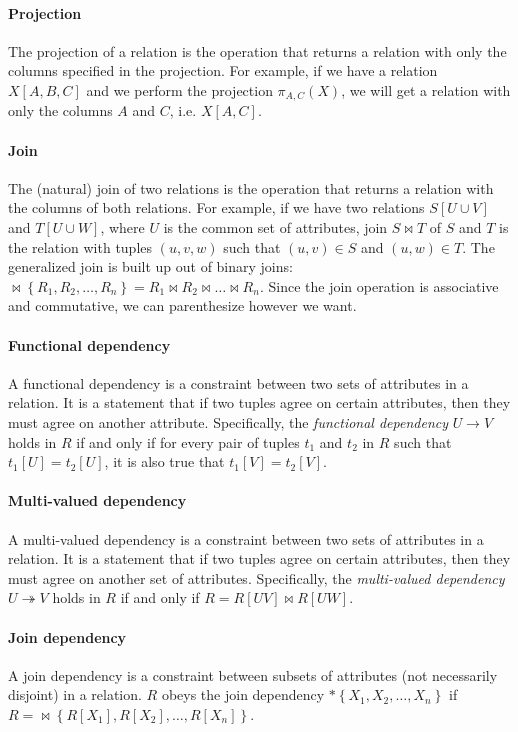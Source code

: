 \paragraph{Projection}  The projection of a relation is the operation that returns a
relation with only the columns specified in the projection.  For example, if we have a
relation $X[A, B, C]$ and we perform the projection $\pi_{A, C}(X)$, we will get a
relation with only the columns $A$ and $C$, i.e. $X[A, C]$.

\paragraph{Join}  The (natural) join of two relations is the operation that returns a
relation with the columns of both relations.  For example, if we have two relations $S[U
\cup V]$ and $T[U \cup W]$, where $U$ is the common set of attributes, join $S \bowtie T$
of $S$ and $T$ is the relation with tuples $(u, v, w)$ such that $(u, v) \in S$ and $(u,
w) \in T$.  The generalized join is built up out of binary joins:  $\bowtie \left\{ R_1,
R_2, \dots, R_n \right\} = R_1 \bowtie R_2 \bowtie \dots \bowtie R_n$. Since the join
operation is associative and commutative, we can parenthesize however we want.

\paragraph{Functional dependency}  A functional dependency is a constraint between two
sets of attributes in a relation.  It is a statement that if two tuples agree on certain
attributes, then they must agree on another attribute.  Specifically, the \emph{functional
dependency} $U \to V$ holds in $R$ if and only if for every pair of tuples $t_1$ and $t_2$
in $R$ such that $t_1[U] = t_2[U]$, it is also true that $t_1[V] = t_2[V]$.

\paragraph{Multi-valued dependency}  A multi-valued dependency is a constraint between
two sets of attributes in a relation.  It is a statement that if two tuples agree on
certain attributes, then they must agree on another set of attributes.  Specifically, the
\emph{multi-valued dependency} $U \twoheadrightarrow V$ holds in $R$ if and only if $R =
R[UV] \bowtie R[UW]$.

\paragraph{Join dependency}  A join dependency is a constraint between subsets of
attributes (not necessarily disjoint) in a relation.  $R$ obeys the join dependency $*
\left\{ X_1, X_2, \dots, X_n \right\}$ if $R = \bowtie \left\{ R[X_1], R[X_2], \dots,
R[X_n] \right\}$.

